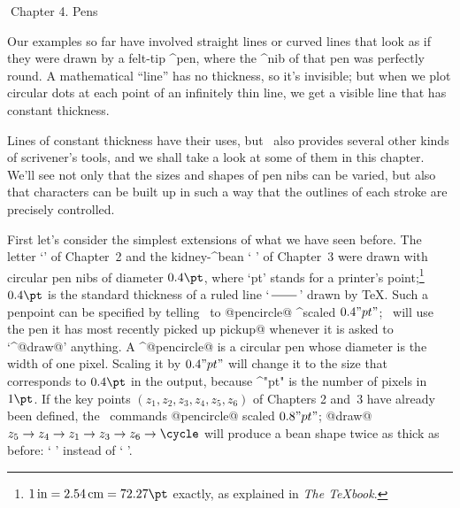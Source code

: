 \eject
\beginchapter Chapter 4. Pens

Our examples so far have involved straight lines or curved lines that look
as if they were drawn by a felt-tip ^{pen}, where the ^{nib} of that pen
was perfectly round.  A mathematical ``line'' has no thickness, so it's
invisible; but when we plot circular dots at each point of an infinitely
thin line, we get a visible line that has constant thickness.

Lines of constant thickness have their uses, but \MF\ also provides
several other kinds of scrivener's tools, and we shall take a look at some
of them in this chapter. We'll see not only that the sizes and shapes of
pen nibs can be varied, but also that characters can be built up in such a
way that the outlines of each stroke are precisely controlled.

\def\kk{\kern2pt } %
First let's consider the simplest extensions of what we have seen before.
The letter `{\manual\Aa}' of Chapter~2 and the kidney-^{bean}
`\kk{\manual\beana}\kk' of Chapter~3 were drawn with circular pen nibs of
diameter $0.4\pt$, where `pt' stands for a printer's point;\footnote*{$
1\,{\rm in}=2.54\,{\rm cm}=72.27\pt$ exactly, as explained in
{\sl The \TeX book}.} $0.4\pt$ is the standard thickness of a ruled line
`$\,\vcenter{\hrule width 2em}\,$' drawn by \TeX. Such a penpoint can be
specified by telling \MF\ to
\begindisplay
\pickup @pencircle@ ^{scaled} $0.4"pt"$;
\enddisplay
\MF\ will use the pen it has most recently picked up ^^@pickup@
whenever it is asked to `^@draw@' anything. A ^@pencircle@ is a
circular pen whose diameter is the width of one pixel. Scaling it
by $0.4"pt"$ will change it to the size that corresponds
to $0.4\pt$ in the output, because ^"pt" is the number of pixels
in $1\pt$. If the key points $(z_1,z_2,z_3,z_4,z_5,z_6)$ of Chapters 2 and~3
have already been defined, the \MF\ commands
\begindisplay
\pickup @pencircle@ scaled $0.8"pt"$;\cr
@draw@ $z_5\to z_4\to z_1\to z_3\to z_6\to \cycle$\cr
\enddisplay
will produce a bean shape twice as thick as before: `\kk{\manual\beanb}\kk'
instead of `\kk{\manual\beana}\kk'.

